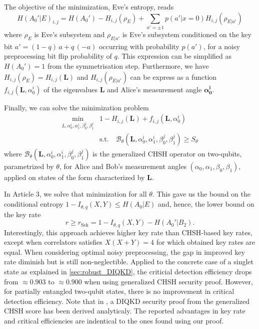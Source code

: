 The objective of the minimization, Eve's entropy, reads
\begin{equation}
	H(A_0'|E)_{i,j} = H(A_0') - H_{i,j}(\rho_E) + \sum_{a' = \pm 1} p(a'|x=0)H_{i,j}(\rho_{E|a'})	
	\label{eq:}
\end{equation}
where $\rho_E$ is Eve's subsystem and $\rho_{E|a'}$ is Eve's subsystem conditioned on the key bit $a' = (1-q)\,a + q\,(-a)$ occurring with probability $p(a')$, for a noisy preprocessing bit flip probability of $q$.
This expression can be simplified as $H(A_0')=1$ from the symmetrisation step.
Furthermore, we have $H_{i,j}(\rho_E)=H_{i,j}(\mathbf{L})$ and $H_{i,j}(\rho_{E|a'})$ can be express as a function $f_{i,j}(\mathbf{L},\alpha_0^i)$ of the eigenvalues $\mathbf{L}$ and Alice's measurement angle $\mathbf{\alpha_0^i}$.

Finally, we can solve the minimization problem 
\begin{equation}
	\begin{split}
		\min_{L,\alpha_0^i,\alpha_1^i,\beta_0^j,\beta_1^j} &1 - H_{i,j}(\mathbf{L}) + f_{i,j}(\mathbf{L},\alpha_0^i) \\
		&\mathrm{s.t.}\quad 
		\mathcal{B}_\theta (\mathbf{L},\alpha_0^i,\alpha_1^i,\beta_0^j,\beta_1^j) \geq S_\theta
	\end{split}
	\label{eq:}
\end{equation}
where $\mathcal{B}_\theta (\mathbf{L},\alpha_0^i,\alpha_1^i,\beta_0^j,\beta_1^j)$ is the generalized CHSH operator on two-qubits, parametrized by $\theta$, for Alice and Bob's measurement angles $(\alpha_0,\alpha_1,\beta_0,\beta_1)$, applied on states of the form  characterized by $\mathbf{L}$.

In Article 3, we solve that minimization for all $\theta$. This gave us the bound on the conditional entropy $1-I_{\theta,q}(X,Y)\leq H(A_0|E)$ and, hence, the lower bound on the key rate
\begin{equation}
	r \geq r_\mathrm{Sek} = 1 - I_{\theta,q}(X,Y) - H(A_0'|B_2).
	\label{eq:Sekatstki}
\end{equation}
Interestingly, this approach achieves higher key rate than CHSH-based key rates, except when correlators satisfies $X(X+Y)=4$ for which obtained key rates are equal.
When considering optimal noisy preprocessing, the gap in improved key rate diminish but is still non-neglectible.
Applied to the concrete case of a singlet state as explained in \ref{sec:robust_DIQKD}, the criticial detection efficiency drops from $\approx 0.903$ to $\approx 0.900$ when using generalized CHSH security proof.
However, for partially entangled two-qubit states, there is no improvement in critical detection efficiency.
Note that in \cite{Woodhead2021}, a DIQKD security proof from the generalized CHSH score has been derived analyticaly. The reported advantages in key rate and critical efficiencies are indentical to the ones found using our proof.

